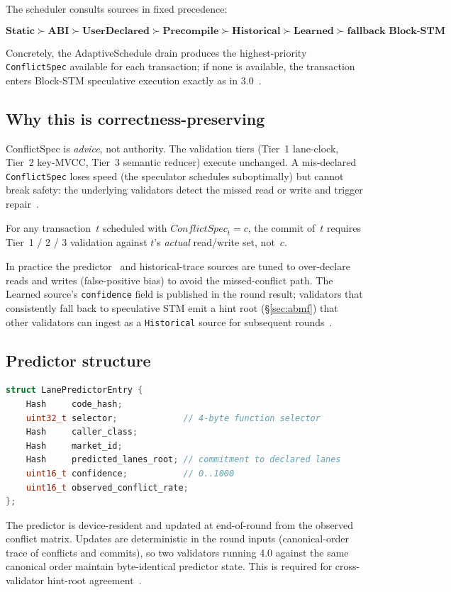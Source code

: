The scheduler consults sources in fixed precedence:

\[
\textbf{Static} \succ \textbf{ABI} \succ \textbf{UserDeclared} \succ \textbf{Precompile} \succ \textbf{Historical} \succ \textbf{Learned} \succ \textbf{fallback Block-STM}
\]

Concretely, the AdaptiveSchedule drain produces the highest-priority
\texttt{ConflictSpec} available for each transaction; if none is
available, the transaction enters Block-STM speculative execution
exactly as in 3.0~\cite{lp010-quasarstm-3}.

\subsection{Why this is correctness-preserving}

ConflictSpec is \emph{advice}, not authority. The validation tiers
(Tier~1 lane-clock, Tier~2 key-MVCC, Tier~3 semantic reducer) execute
unchanged. A mis-declared \texttt{ConflictSpec} loses speed (the
speculator schedules suboptimally) but cannot break safety: the
underlying validators detect the missed read or write and trigger
repair~\cite{aft2025conflictspec}.

\begin{invariant}
For any transaction~$t$ scheduled with $\mathit{ConflictSpec}_t = c$,
the commit of~$t$ requires Tier~1 / 2 / 3 validation against $t$'s
\emph{actual} read/write set, not~$c$.
\end{invariant}

In practice the predictor~\cite{foresight2025} and historical-trace
sources are tuned to over-declare reads and writes (false-positive bias)
to avoid the missed-conflict path. The Learned source's
\texttt{confidence} field is published in the round result; validators
that consistently fall back to speculative STM emit a hint root
(\S\ref{sec:abmf}) that other validators can ingest as a
\texttt{Historical} source for subsequent rounds~\cite{chiron2025}.

\subsection{Predictor structure}

\begin{lstlisting}[language=C++]
struct LanePredictorEntry {
    Hash     code_hash;
    uint32_t selector;             // 4-byte function selector
    Hash     caller_class;
    Hash     market_id;
    Hash     predicted_lanes_root; // commitment to declared lanes
    uint16_t confidence;           // 0..1000
    uint16_t observed_conflict_rate;
};
\end{lstlisting}

The predictor is device-resident and updated at end-of-round from the
observed conflict matrix. Updates are deterministic in the round
inputs (canonical-order trace of conflicts and commits), so two
validators running 4.0 against the same canonical order maintain
byte-identical predictor state. This is required for cross-validator
hint-root agreement~\cite{chiron2025}.

